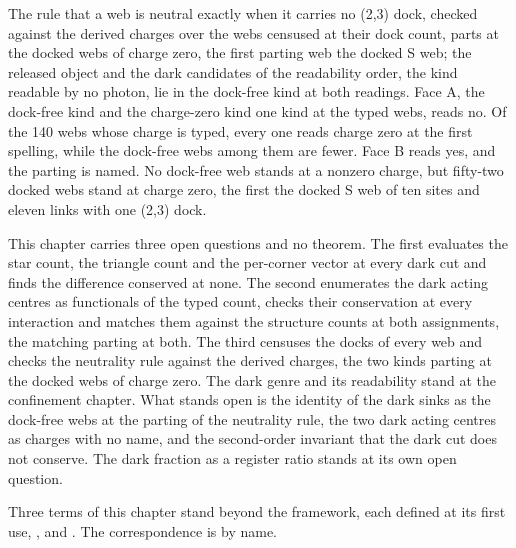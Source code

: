 \begin{chwall}\label{box:X-7-dark-matter-as-the-dock-free-sinks:3}
The rule that a web is neutral exactly when it carries no (2,3) dock, checked against the derived charges over the webs censused at their dock count, parts at the docked webs of charge zero, the first parting web the docked S web; the released object and the dark candidates of the readability order, the kind readable by no photon, lie in the dock-free kind at both readings. Face A, the dock-free kind and the charge-zero kind one kind at the typed webs, reads no. Of the 140 webs whose charge is typed, every one reads charge zero at the first spelling, while the dock-free webs among them are fewer. Face B reads yes, and the parting is named. No dock-free web stands at a nonzero charge, but fifty-two docked webs stand at charge zero, the first the docked S web of ten sites and eleven links with one (2,3) dock.
\end{chwall}
This chapter carries three open questions and no theorem. The first evaluates the star count, the triangle count and the per-corner vector at every dark cut and finds the difference conserved at none. The second enumerates the dark acting centres as functionals of the typed count, checks their conservation at every interaction and matches them against the structure counts at both assignments, the matching parting at both. The third censuses the docks of every web and checks the neutrality rule against the derived charges, the two kinds parting at the docked webs of charge zero. The dark genre and its readability stand at the confinement chapter. What stands open is the identity of the dark sinks as the dock-free webs at the parting of the neutrality rule, the two dark acting centres as charges with no name, and the second-order invariant that the dark cut does not conserve. The dark fraction as a register ratio stands at its own open question.
\begin{chbridge}
Three terms of this chapter stand beyond the framework, each defined at its first use, ,  and . The correspondence is by name.
\end{chbridge}
